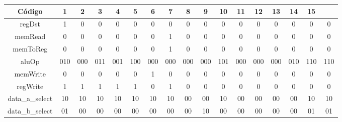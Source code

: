 	\begin{center}
		\begin{longtable}[pos]{| c | c | c | c | c | c | c | c | c | c | c | c | c | c | c | c | c |} \hline
			\multicolumn{1}{|c|}{\cellcolor[gray]{0.9}\textbf{\small Código}} & 
			\multicolumn{1}{c|}{\cellcolor[gray]{0.9}\textbf{1}} & 
			\multicolumn{1}{c|}{\cellcolor[gray]{0.9}\textbf{2}} &
			\multicolumn{1}{c|}{\cellcolor[gray]{0.9}\textbf{3}} &
            \multicolumn{1}{c|}{\cellcolor[gray]{0.9}\textbf{4}} &
            \multicolumn{1}{c|}{\cellcolor[gray]{0.9}\textbf{5}} &
            \multicolumn{1}{c|}{\cellcolor[gray]{0.9}\textbf{6}} &
            \multicolumn{1}{c|}{\cellcolor[gray]{0.9}\textbf{7}} &
            \multicolumn{1}{c|}{\cellcolor[gray]{0.9}\textbf{8}} &
            \multicolumn{1}{c|}{\cellcolor[gray]{0.9}\textbf{9}} &
            \multicolumn{1}{c|}{\cellcolor[gray]{0.9}\textbf{10}} &
			\multicolumn{1}{c|}{\cellcolor[gray]{0.9}\textbf{11}} &
			\multicolumn{1}{c|}{\cellcolor[gray]{0.9}\textbf{12}} &
            \multicolumn{1}{c|}{\cellcolor[gray]{0.9}\textbf{13}} &
            \multicolumn{1}{c|}{\cellcolor[gray]{0.9}\textbf{14}} &
            \multicolumn{1}{c|}{\cellcolor[gray]{0.9}\textbf{15}} \\ \hline
			\endhead
			\hline
			\endlastfoot
			
			\small regDst 			& 1   & 0   & 0   & 0   & 0   & 0   & 0   & 0   & 0   & 0   & 0   & 0   & 0  & 0 & 0 & 0\\ \hline
            \small memRead 			& 0   & 0   & 0   & 0   & 0   & 0   & 1   & 0   & 0   & 0   & 0   & 0   & 0  & 0 & 0 & 0\\ \hline
            \small memToReg 		& 0   & 0   & 0   & 0   & 0   & 0   & 1   & 0   & 0   & 0   & 0   & 0   & 0  & 0 & 0 & 0\\ \hline
            
            \small aluOp 			& \small 010 & \small 000 & \small 011 & \small 001 & \small 100 & \small 000 & \small 000 & \small 000 & \small 000 & \small 101 & \small 000 & \small 000 & \small 000 & \small 010 & \small 110 & \small 110\\ \hline
            
            \small memWrite 		& 0   & 0   & 0   & 0   & 0   & 1   & 0   & 0   & 0   & 0   & 0   & 0   & 0  & 0 & 0& 0\\ \hline
            \small regWrite 		& 1   & 1   & 1   & 1   & 1   & 0   & 1   & 0   & 0   & 0   & 0   & 0   & 0  & 0 & 0 & 0\\ \hline
            \small data\_a\_select	& 10  & 10  & 10  & 10  & 10  & 10  & 10  & 00  & 00  & 10  & 00  & 00  & 00 & 00 & 10 & 10\\ \hline
            \small data\_b\_select 	& 01  & 00  & 00  & 00  & 00  & 00  & 00  & 00  & 10  & 00  & 00  & 00  & 00 & 00 & 01 & 01\\ \hline
            

\end{longtable}
\end{center}
